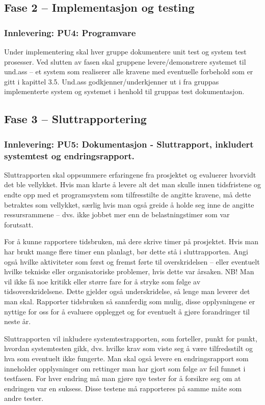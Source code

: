 \subsection{Fase 2 – Implementasjon og testing}

\subsubsection{Innlevering: PU4: Programvare}

Under implementering skal hver gruppe dokumentere unit test og system test prosesser. Ved slutten av fasen skal gruppene levere/demonstrere systemet til und.ass – et system som realiserer alle kravene med eventuelle forbehold som er gitt i kapittel 3.5. Und.ass godkjenner/underkjenner ut i fra gruppas implementerte system og systemet i henhold til gruppas test dokumentasjon.

\subsection{Fase 3 – Sluttrapportering}

\subsubsection{Innlevering: PU5: Dokumentasjon - Sluttrapport, inkludert systemtest og endringsrapport.}

Sluttrapporten skal oppsummere erfaringene fra prosjektet og evaluerer hvorvidt det ble vellykket. Hvis man klarte å levere alt det man skulle innen tidsfristene og endte opp med et programsystem som tilfresstilte de angitte kravene, må dette betraktes som vellykket, særlig hvis man også greide å holde seg inne de angitte ressursrammene – dvs. ikke jobbet mer enn de belastningstimer som var forutsatt. 

For å kunne rapportere tidsbruken, må dere skrive timer på prosjektet. Hvis man har brukt mange flere timer enn planlagt, bør dette stå i sluttrapporten. Angi også hvilke aktiviteter som først og fremst førte til overskridelsen – eller eventuelt hvilke tekniske eller organisatoriske problemer, hvis dette var årsaken. NB! Man vil ikke få noe kritikk eller større fare for å stryke som følge av tidsoverskridelsene. Dette gjelder også underskridelse, så lenge man leverer det man skal. Rapporter tidsbruken så sannferdig som mulig, disse opplysningene er nyttige for oss for å evaluere opplegget og for eventuelt å gjøre forandringer til neste år.

Sluttrapporten vil inkludere systemtestrapporten, som forteller, punkt for punkt, hvordan systemtesten gikk, dvs. hvilke krav som viste seg å være tilfredsstilt og hva som eventuelt ikke fungerte. Man skal også levere en endringsrapport som inneholder opplysninger om rettinger man har gjort som følge av feil funnet i testfasen. For hver endring må man gjøre nye tester for å forsikre seg om at endringen var en suksess. Disse testene må rapporteres på samme måte som andre tester.

